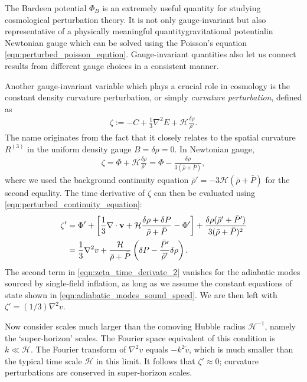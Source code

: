The Bardeen potential $\Phi_B$ is an extremely useful quantity for studying cosmological perturbation theory. It is not only gauge-invariant but also representative of a physically meaningful quantity\textemdash gravitational potential\textemdash in Newtonian gauge which can be solved using the Poisson's equation \eqref{eqn:perturbed_poisson_eqution}. Gauge-invariant quantities also let us connect results from different gauge choices in a consistent manner.

Another gauge-invariant variable which plays a crucial role in cosmology is the constant density curvature perturbation, or simply \textit{curvature perturbation}, defined as
\begin{align}
	\zeta := - C + \frac{1}{3} \nabla^2 E + \mathcal{H} \frac{\delta\rho}{\bar{\rho}'}. \label{def:curvature_perturbation}
\end{align}
The name originates from the fact that it closely relates to the spatial curvature $R^{(3)}$ in the uniform density gauge $B=\delta\rho=0$. In Newtonian gauge,
\begin{align}
	\zeta = \Phi + \mathcal{H}\frac{\delta\rho}{\bar{\rho}'} = \Phi - \frac{\delta\rho}{3(\bar{\rho}+\bar{P})},
\end{align}
where we used the background continuity equation $\bar{\rho}'=-3\mathcal{H}(\bar{\rho}+\bar{P})$ for the second equality. The time derivative of $\zeta$ can then be evaluated using \eqref{eqn:perturbed_continuity_equation}:
\begin{align}
	\zeta' &= \Phi' + \left[ \frac{1}{3}\nabla\cdot\mathbf{v} + \mathcal{H}\frac{\delta\rho + \delta P}{\bar{\rho} + \bar{P}} - \Phi' \right] + \frac{\delta\rho (\bar{\rho}' + \bar{P}')}{3(\bar{\rho}+\bar{P})^2}  \label{eqn:zeta_time_derivate_1} \\
	&= \frac{1}{3}\nabla^2 v + \frac{\mathcal{H}}{\bar{\rho} + \bar{P}} \left( \delta P - \frac{\bar{P}'}{\bar{\rho}'} \delta\rho \right). \label{eqn:zeta_time_derivate_2}
\end{align}
The second term in \eqref{eqn:zeta_time_derivate_2} vanishes for the adiabatic modes sourced by single-field inflation, as long as we assume the constant equations of state shown in \eqref{eqn:adiabatic_modes_sound_speed}. We are then left with $\zeta' = (1/3) \nabla^2 v$.

Now consider scales much larger than the comoving Hubble radius $\mathcal{H}^{-1}$, namely the `super-horizon' scales. The Fourier space equivalent of this condition is $k \ll \mathcal{H}$. The Fourier transform of $\nabla^2 v$ equals $-k^2 \tilde{v}$, which is much smaller than the typical time scale $\mathcal{H}$ in this limit. It follows that $\zeta'\approx 0$; curvature perturbations are conserved in super-horizon scales.


